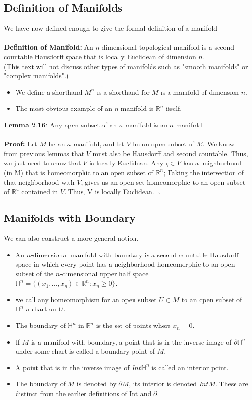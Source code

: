 \documentclass{article}
\begin{document}
\subsection{Definition of Manifolds}
We have now defined enough to give the formal definition of a manifold:\\
\\
\textbf{Definition of Manifold:} An $n$-dimensional topological manifold is a second countable Hausdorff space that is locally Euclidean of dimension $n$.\\
(This text will not discuss other types of manifolds such as "smooth manifolds" or "complex manifolds".)
\begin{itemize}
    \item We define a shorthand $M^n$ is a shorthand for $M$ is a manifold of dimension $n$.
    \item The most obvious example of an $n$-manifold is $\mathbb{R}^n$ itself.
\end{itemize}
\textbf{Lemma 2.16:} Any open subset of an $n$-manifold is an $n$-manifold.\\
\\
\textbf{Proof:} Let $M$ be an $n$-manifold, and let $V$ be an open subset of $M$. We know from previous lemmas that $V$ must also be Hausdorff and second countable. Thus, we just need to show that $V$ is locally Euclidean. Any $q\in V$ has a neighborhood (in M) that is homeomorphic to an open subset of $\mathbb{R}^n$; Taking the intersection of that neighborhood with $V$, gives us an open set homeomorphic to an open subset of $\mathbb{R}^n$ contained in $V$. Thus, V is locally Euclidean. $\square$.\\

\subsection{Manifolds with Boundary}
We can also construct a more general notion.
\begin{itemize}
    \item An $n$-dimensional manifold with boundary is a second countable Hausdorff space in which every point has a neighborhood homeomorphic to an open subset of the $n$-dimensional upper half space $\mathbb{H}^n=\{(x_1,...,x_n)\in\mathbb{R}^n:x_n\geq 0\}$.
    \item we call any homeomorphism for an open subset $U\subset M$ to an open subset of $\mathbb{H}^n$ a chart on $U$.
    \item The boundary of $\mathbb{H}^n$ in $\mathbb{R}^n$ is the set of points where $x_n=0$.
    \item If $M$ is a manifold with boundary, a point that is in the inverse image of $\partial\mathbb{H}^n$ under some chart is called a boundary point of $M$.
    \item A point that is in the inverse image of $Int\mathbb{H}^n$ is called an interior point.
    \item The boundary of $M$ is denoted by $\partial M$, its interior is denoted $Int M$. These are distinct from the earlier definitions of Int and $\partial$.
\end{itemize}
\end{document}
